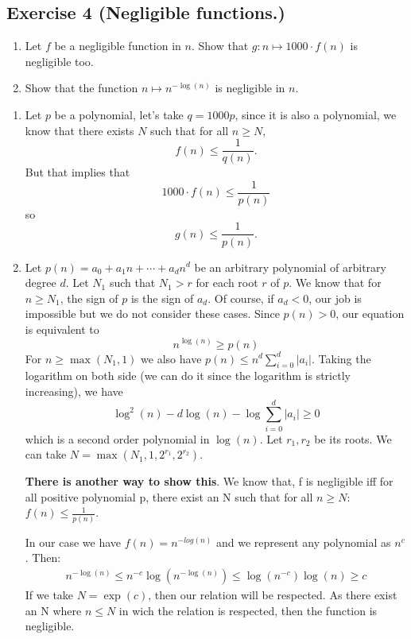 \subsection{Exercise 4 (Negligible functions.)}

\begin{enumerate}
\item Let $f$ be a negligible function in $n$. Show that $g: n \mapsto
  1000\cdot f(n)$ is negligible too.
\item Show that the function $n \mapsto n^{-\log(n)}$ is negligible in $n$.
\end{enumerate}


\begin{solution}
  \begin{enumerate}
    \item Let $p$ be a polynomial,
      let's take $q = 1000p$,
      since it is also a polynomial, we know
      that there exists $N$ such that for all $n \geq N$,
      \[ f(n) \leq \frac{1}{q(n)}. \]
      But that implies that
      \[ 1000 \cdot f(n) \leq \frac{1}{p(n)} \]
      so
      \[ g(n) \leq \frac{1}{p(n)}. \]
    \item Let $p(n) = a_0 + a_1 n + \cdots + a_dn^d$ be an
      arbitrary polynomial of arbitrary degree $d$.
      Let $N_1$ such that $N_1 > r$ for each root $r$ of $p$.
      We know that for $n \geq N_1$, the sign of $p$ is the sign of $a_d$.
      Of course, if $a_d < 0$, our job is impossible but we do not consider these cases.
      Since $p(n) > 0$, our equation is equivalent to
      \[ n^{\log(n)} \geq p(n) \]
      For $n \geq \max(N_1,1)$ we also have
      $p(n) \leq n^d \sum_{i=0}^d|a_i|$.
      Taking the logarithm on both side (we can do it since the logarithm is strictly increasing),
      we have	%
      \[ \log^2(n) - d \log(n) - \log\sum_{i=0}^d|a_i| \geq 0 \]
      which is a second order polynomial in $\log(n)$.
      Let $r_1,r_2$ be its roots.
      We can take $N = \max(N_1,1,2^{r_1},2^{r_2})$.

      \textbf{There is another way to show this}. We know that, f is negligible iff for all positive polynomial p, there exist an N such that for all $n\geq N$: $ f(n) \leq \frac{1}{p(n)}$.

      In our case we have $f(n) = n^{-log(n)}$ and we represent any polynomial as $n^c$. Then:
      \begin{align*}
          n^{-\log(n)} \leq n^{-c}
          \log(n^{-\log(n)}) \leq \log(n^{-c})
          \log(n) \geq c
      \end{align*}
      If we take $N = \exp(c)$, then our relation will be respected. As there exist an N where $n\leq N$ in wich the relation is respected, then the function is negligible.
  \end{enumerate}
\end{solution}



